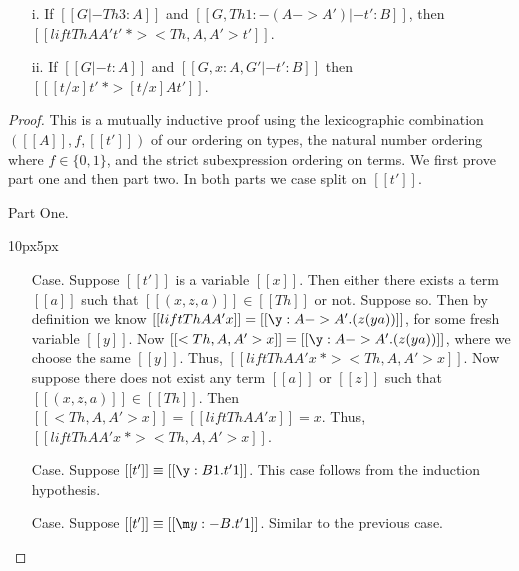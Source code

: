 \begin{lemma}
  \label{lemma:soundness_reduction}  
  \begin{itemize}
  \item[i.] If $[[G |- Th 3 : A]]$ and $[[G, Th 1:{-(A->A')} |- t' : B]]$, then
    $[[lift Th A A' t' ~*> <Th,A,A'>t']]$.
  
  \item[ii.] If $[[G |- t : A]]$ and $[[G, x:A, G' |- t':B]]$ then 
    $[[ [t/x]t' ~*> [t/x] A t']]$.   
  \end{itemize}  
\end{lemma}
\begin{proof}
  This is a mutually inductive proof using the lexicographic combination\\
  $([[A]], f,[[t']])$ of our ordering on types,
  the natural number ordering where $f \in \{0,1\}$, and
  the strict subexpression ordering on terms. We first prove part one
  and then part two.  In both parts we case split on $[[t']]$.

  \noindent Part One.
  \vspace{-25px}
  \begin{changemargin}{10px}{5px}\noindent
  \begin{itemize}
  \item[Case.] Suppose $[[t']]$ is a variable $[[x]]$.  Then either there exists
    a term $[[a]]$ such that $[[(x,z,a)]] \in [[Th]]$ or not.  Suppose so. 
    Then by definition we know $[[lift Th A A' x]] = [[\y:A->A'.(z (y a))]]$,
    for some fresh variable $[[y]]$.  Now $[[<Th,A,A'>x]] = [[\y:A->A'.(z (y a))]]$,
    where we choose the same $[[y]]$.  Thus, $[[lift Th A A' x ~*> <Th,A,A'>x]]$.
    Now suppose there does not exist any term $[[a]]$ or $[[z]]$ such that $[[(x,z,a)]] \in [[Th]]$.
    Then $[[<Th,A,A'>x]] = [[lift Th A A' x]] = x$. Thus, $[[lift Th A A' x ~*> <Th,A,A'>x]]$.

  \item[Case.] Suppose $[[t']] \equiv [[\y:B1.t'1]]$. This case follows from the
    induction hypothesis.

  \item[Case.] Suppose $[[t']] \equiv [[\m y:{-B}.t'1]]$. Similar to the previous case.


\end{itemize}
\end{changemargin}
\end{proof}
